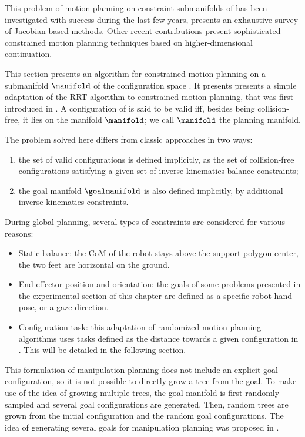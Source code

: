 This problem of motion planning on constraint submanifolds of \cspace
has been investigated with success during the last few years,
\cite{berenson2011task} presents an exhaustive survey of
Jacobian-based methods. Other recent contributions
\cite{porta2012randomized} present sophisticated constrained motion
planning techniques based on higher-dimensional continuation.

This section presents an algorithm for constrained motion planning on
a submanifold $\manifold$ of the configuration space \cspace. It
presents presents a simple adaptation of the RRT algorithm to
constrained motion planning, that was first introduced in
\cite{dalibard09}. A configuration \config{} of \cspace is said to be valid
iff, besides being collision-free, it lies on the manifold
$\manifold$; we call $\manifold$ the planning manifold.

The problem solved here differs from classic approaches in two ways:
\begin{enumerate}
\item the set of valid configurations is defined implicitly, as the
  set of collision-free configurations satisfying a given set of
  inverse kinematics balance constraints;
\item the goal manifold $\goalmanifold$ is also defined implicitly,
  by additional inverse kinematics constraints.
\end{enumerate}
During global planning, several types of constraints are considered
for various reasons:
\begin{itemize}
\item Static balance: the CoM of the robot stays above the support
  polygon center, the two feet are horizontal on the ground.
\item End-effector position and orientation: the goals of some
  problems presented in the experimental section of this chapter are
  defined as a specific robot hand pose, or a gaze direction.
\item Configuration task: this adaptation of randomized motion
  planning algorithms uses tasks defined as the distance towards a
  given configuration in \cspace. This will be detailed in the
  following section.
\end{itemize}

This formulation of manipulation planning does not include an explicit
goal configuration, so it is not possible to directly grow a tree from
the goal. To make use of the idea of growing multiple trees, the goal
manifold is first randomly sampled and several goal configurations are
generated. Then, random trees are grown from the initial configuration
and the random goal configurations. The idea of generating several
goals for manipulation planning was proposed in \cite{diankov2008bpc}.

